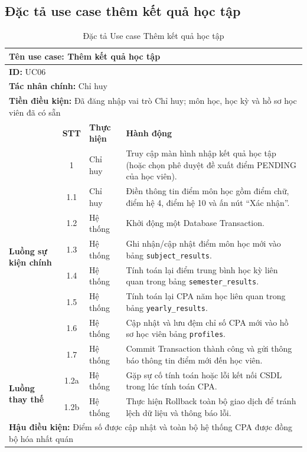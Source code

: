 \documentclass[../DoAn.tex]{subfiles}
\begin{document}
\subsection{Đặc tả use case thêm kết quả học tập}
\hfill
\begin{table}[H]
\centering
\small
\renewcommand{\arraystretch}{1.2}
\begin{tabular}{|p{2.2cm}|c|p{2cm}|p{8.5cm}|}
\hline
\multicolumn{4}{|l|}{\textbf{Tên use case:} Thêm kết quả học tập} \\ \hline
\multicolumn{4}{|l|}{\textbf{ID:} UC06} \\ \hline
\multicolumn{4}{|l|}{\textbf{Tác nhân chính:} Chỉ huy} \\ \hline
\multicolumn{4}{|l|}{\textbf{Tiền điều kiện:} Đã đăng nhập vai trò Chỉ huy; môn học, học kỳ và hồ sơ học viên đã có sẵn} \\ \hline
 & \textbf{STT} & \textbf{Thực hiện} & \textbf{Hành động} \\ \hline
\multirow{8}{2.2cm}{\textbf{Luồng sự kiện chính}} 
& 1 & Chỉ huy & Truy cập màn hình nhập kết quả học tập (hoặc chọn phê duyệt đề xuất điểm PENDING của học viên). \\ \cline{2-4}
& 1.1 & Chỉ huy & Điền thông tin điểm môn học gồm điểm chữ, điểm hệ 4, điểm hệ 10 và ấn nút ``Xác nhận''. \\ \cline{2-4}
& 1.2 & Hệ thống & Khởi động một Database Transaction. \\ \cline{2-4}
& 1.3 & Hệ thống & Ghi nhận/cập nhật điểm môn học mới vào bảng \texttt{subject\_results}. \\ \cline{2-4}
& 1.4 & Hệ thống & Tính toán lại điểm trung bình học kỳ liên quan trong bảng \texttt{semester\_results}. \\ \cline{2-4}
& 1.5 & Hệ thống & Tính toán lại CPA năm học liên quan trong bảng \texttt{yearly\_results}. \\ \cline{2-4}
& 1.6 & Hệ thống & Cập nhật và lưu đệm chỉ số CPA mới vào hồ sơ học viên bảng \texttt{profiles}. \\ \cline{2-4}
& 1.7 & Hệ thống & Commit Transaction thành công và gửi thông báo thông tin điểm mới đến học viên. \\ \hline
\multirow{2}{2.2cm}{\textbf{Luồng thay thế}} 
& 1.2a & Hệ thống & Gặp sự cố tính toán hoặc lỗi kết nối CSDL trong lúc tính toán CPA. \\ \cline{2-4}
& 1.2b & Hệ thống & Thực hiện Rollback toàn bộ giao dịch để tránh lệch dữ liệu và thông báo lỗi. \\ \hline
\multicolumn{4}{|l|}{\textbf{Hậu điều kiện:} Điểm số được cập nhật và toàn bộ hệ thống CPA được đồng bộ hóa nhất quán} \\ \hline
\end{tabular}
\caption{Đặc tả Use case Thêm kết quả học tập}
\label{table:uc_add_grade}
\end{table}
\end{document}
